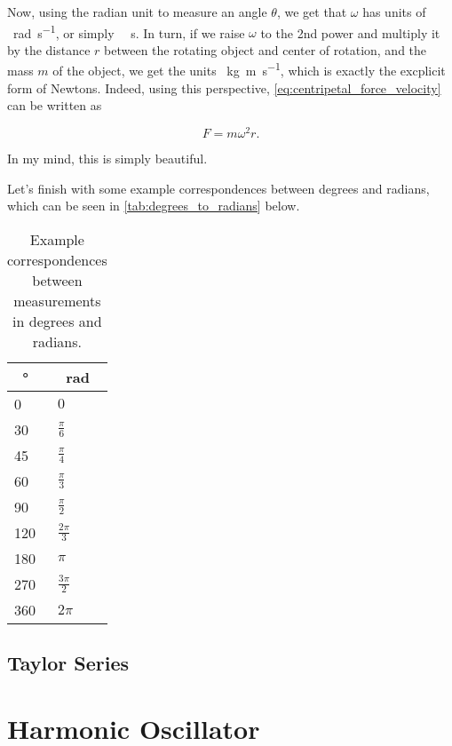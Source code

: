 Now, using the radian unit to measure an angle $\theta$, we get that $\omega$ has units of \SI{}{\radian\per\second}, or simply \SI{}{\per\second}. In turn, if we raise $\omega$ to the 2nd power and multiply it by the distance $r$ between the rotating object and center of rotation, and the mass $m$ of the object, we get the units \SI{}{\kilo\gram\meter\per\second}, which is exactly the excplicit form of Newtons. Indeed, using this perspective, \autoref{eq:centripetal_force_velocity} can be written as

\begin{equation}
  F = m\omega^{2}r.
  \label{eq:centripetal_force_angular_velocity}
\end{equation}

In my mind, this is simply beautiful.

Let's finish with some example correspondences between degrees and radians, which can be seen in \autoref{tab:degrees_to_radians} below.

\begin{table}
  \caption{Example correspondences between measurements in degrees and radians.}
  \label{tab:degrees_to_radians}
  \begin{center}
    {
      \renewcommand{\arraystretch}{1.2}
      \begin{tabular}[c]{l|l}
        \toprule
        \SI{}{\degree} & \SI{}{\radian}\\
        \midrule
        0   & $0$ \\
        30  & $\frac{\pi}{6}$ \\
        45  & $\frac{\pi}{4}$ \\
        60  & $\frac{\pi}{3}$ \\
        90  & $\frac{\pi}{2}$ \\
        120 & $\frac{2\pi}{3}$ \\
        180 & $\pi$ \\
        270 & $\frac{3\pi}{2}$ \\
        360 & $2\pi$ \\
        \bottomrule
      \end{tabular}
    }
  \end{center}
\end{table}


\subsection{Taylor Series}

\section{Harmonic Oscillator}
